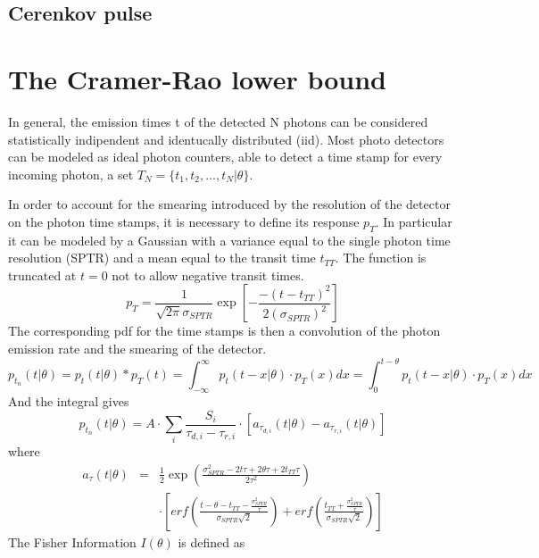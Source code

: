 \subsection{Cerenkov pulse}


\section{The Cramer-Rao lower bound}
In general, the emission times t of the detected N photons can be considered statistically indipendent and identucally distributed (iid).
Most photo detectors can be modeled as ideal photon counters, able to detect a time stamp for every incoming photon, a set $T_{N} = \{ t_{1}, t_{2}, ..., t_{N}|\theta \}$.

In order to account for the smearing introduced by the resolution of the detector on the photon time stamps, it is necessary to define its response $p_{T}$. In particular  it can be modeled by a Gaussian with a variance equal to the single photon time resolution (SPTR) and a mean equal to the transit time $t_{TT}$. The function is truncated at $t=0$ not to allow negative transit times.
\begin{equation}
p_{T} = \frac{1}{\sqrt {2\pi} \sigma _{SPTR}} \exp{\left[-\frac{-(t-t_{TT})^{2}}{2(\sigma _{SPTR})^{2}}\right]}
\end{equation}
The corresponding pdf for the time stamps is then a convolution of the photon emission rate and the smearing of the detector.
\begin{equation}
p_{t_{n}}(t|\theta) = p_{t}(t|\theta)\ast p_{T}(t)= \int _{-\infty}^{\infty}p_{t}(t-x|\theta) \cdot p_{T}(x)dx = \int _{0}^{t-\theta}p_{t}(t-x|\theta) \cdot p_{T}(x)dx
\end{equation}
And the integral gives
\begin{equation}
p_{t_{n}}(t|\theta) = A \cdot \sum _{i} \frac{S_{i}}{\tau _{d,i} - \tau _{r,i}} \cdot \left[ a_{\tau _{d, i}}(t|\theta) - a_{\tau _{r,i}}(t|\theta)\right]
\end{equation}
where 
\begin{eqnarray}
a _{\tau}(t|\theta) &=& \frac{1}{2} \exp{\left(\frac{\sigma _{SPTR} ^{2} - 2t\tau +2\theta \tau + 2t_{TT}\tau}{2\tau ^{2}}\right)} \\
&& \cdot \left[ erf\left( \frac{t-\theta -t_{TT} - \frac{\sigma ^{2}_{SPTR}}{\tau}}{\sigma _{SPTR}\sqrt{2}} \right) + erf \left( \frac{t_{TT}+\frac{\sigma ^{2} _{SPTR}}{\tau}}{\sigma _{SPTR}\sqrt{2}} \right) \right]
\end{eqnarray}
The Fisher Information $I(\theta)$ is defined as
